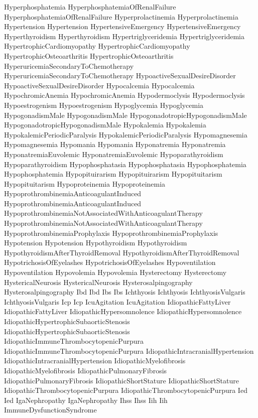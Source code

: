  Hyperphosphatemia
 HyperphosphatemiaOfRenalFailure
 HyperphosphatemiaOfRenalFailure
 Hyperprolactinemia
 Hyperprolactinemia
 Hypertension
 Hypertension
 HypertensiveEmergency
 HypertensiveEmergency
 Hyperthyroidism
 Hyperthyroidism
 Hypertriglyceridemia
 Hypertriglyceridemia
 HypertrophicCardiomyopathy
 HypertrophicCardiomyopathy
 HypertrophicOsteoarthritis
 HypertrophicOsteoarthritis
 HyperuricemiaSecondaryToChemotherapy
 HyperuricemiaSecondaryToChemotherapy
 HypoactiveSexualDesireDisorder
 HypoactiveSexualDesireDisorder
 Hypocalcemia
 Hypocalcemia
 HypochromicAnemia
 HypochromicAnemia
 Hypodermoclysis
 Hypodermoclysis
 Hypoestrogenism
 Hypoestrogenism
 Hypoglycemia
 Hypoglycemia
 HypogonadismMale
 HypogonadismMale
 HypogonadotropicHypogonadismMale
 HypogonadotropicHypogonadismMale
 Hypokalemia
 Hypokalemia
 HypokalemicPeriodicParalysis
 HypokalemicPeriodicParalysis
 Hypomagnesemia
 Hypomagnesemia
 Hypomania
 Hypomania
 Hyponatremia
 Hyponatremia
 HyponatremiaEuvolemic
 HyponatremiaEuvolemic
 Hypoparathyroidism
 Hypoparathyroidism
 Hypophosphatasia
 Hypophosphatasia
 Hypophosphatemia
 Hypophosphatemia
 Hypopituirarism
 Hypopituirarism
 Hypopituitarism
 Hypopituitarism
 Hypoproteinemia
 Hypoproteinemia
 HypoprothrombinemiaAnticoagulantInduced
 HypoprothrombinemiaAnticoagulantInduced
 HypoprothrombinemiaNotAssociatedWithAnticoagulantTherapy
 HypoprothrombinemiaNotAssociatedWithAnticoagulantTherapy
 HypoprothrombinemiaProphylaxis
 HypoprothrombinemiaProphylaxis
 Hypotension
 Hypotension
 Hypothyroidism
 Hypothyroidism
 HypothyroidismAfterThyroidRemoval
 HypothyroidismAfterThyroidRemoval
 HypotrichosisOfEyelashes
 HypotrichosisOfEyelashes
 Hypoventilation
 Hypoventilation
 Hypovolemia
 Hypovolemia
 Hysterectomy
 Hysterectomy
 HystericalNeurosis
 HystericalNeurosis
 Hysterosalpingography
 Hysterosalpingography
 Ibd
 Ibd
 Ibs
 Ibs
 Ichthyosis
 Ichthyosis
 IchthyosisVulgaris
 IchthyosisVulgaris
 Icp
 Icp
 IcuAgitation
 IcuAgitation
 IdiopathicFattyLiver
 IdiopathicFattyLiver
 IdiopathicHypersomnolence
 IdiopathicHypersomnolence
 IdiopathicHypertrophicSubaorticStenosis
 IdiopathicHypertrophicSubaorticStenosis
 IdiopathicImmuneThrombocytopenicPurpura
 IdiopathicImmuneThrombocytopenicPurpura
 IdiopathicIntracranialHypertension
 IdiopathicIntracranialHypertension
 IdiopathicMyelofibrosis
 IdiopathicMyelofibrosis
 IdiopathicPulmonaryFibrosis
 IdiopathicPulmonaryFibrosis
 IdiopathicShortStature
 IdiopathicShortStature
 IdiopathicThrombocytopenicPurpura
 IdiopathicThrombocytopenicPurpura
 Ied
 Ied
 IgaNephropathy
 IgaNephropathy
 Ihss
 Ihss
 Iih
 Iih
 ImmuneDysfunctionSyndrome
